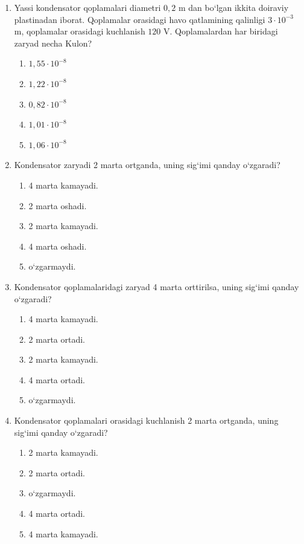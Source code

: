 \begin{enumerate}
\item Yassi kondensator qoplamalari diametri $0,2$ m dan bo‘lgan ikkita doiraviy plastinadan iborat. Qoplamalar orasidagi havo qatlamining qalinligi $3\cdot10^{-3}$ m, qoplamalar orasidagi kuchlanish $120$ V. Qoplamalardan har biridagi zaryad necha Kulon?
\begin{enumerate}[label=\Alph*)]
\item $1,55\cdot10^{-8}$
\item $1,22\cdot10^{-8}$
\item $0,82\cdot10^{-8}$
\item $1,01\cdot10^{-8}$
\item $1,06\cdot10^{-8}$
\end{enumerate}

\item Kondensator zaryadi 2 marta ortganda, uning sig‘imi qanday o‘zgaradi?
\begin{enumerate}[label=\Alph*)]
\item 4 marta kamayadi.
\item 2 marta oshadi.
\item 2 marta kamayadi.
\item 4 marta oshadi.
\item o‘zgarmaydi.
\end{enumerate}

\item Kondensator qoplamalaridagi zaryad 4 marta orttirilsa, uning sig‘imi qanday o‘zgaradi?
\begin{enumerate}[label=\Alph*)]
\item 4 marta kamayadi.
\item 2 marta ortadi.
\item 2 marta kamayadi.
\item 4 marta ortadi.
\item o‘zgarmaydi.
\end{enumerate}

\item Kondensator qoplamalari orasidagi kuchlanish 2 marta ortganda, uning sig‘imi qanday o‘zgaradi?
\begin{enumerate}[label=\Alph*)]
\item 2 marta kamayadi.
\item 2 marta ortadi.
\item o‘zgarmaydi.
\item 4 marta ortadi.
\item 4 marta kamayadi.
\end{enumerate}


\end{enumerate}
